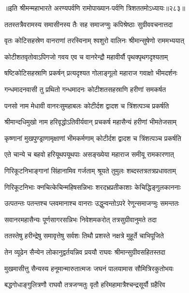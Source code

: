 ॥इति श्रीमन्महाभारते अरण्यपर्वणि रामोपाख्यान-पर्वणि त्रिशततमोऽध्यायः॥२८३॥

\storymeta

\resetShloka



\twolineshloka
{ततस्तत्रैवरामस्य समासीनस्य तैः सह}
{समाजग्मुः कपिश्रेष्ठाः सुग्रीववचनात्तदा}


\twolineshloka
{वृतः कोटिसहस्रेण वानराणां तरस्विनाम्}
{श्वशुरो वालिनः श्रीमान्सुषेणो राममभ्ययात्}


\twolineshloka
{कोटीशतवृतोवाऽपिगजो गवय एव च}
{वानरेन्द्रौ महावीर्यौ पृथक्पृथगदृश्यताम्}


\twolineshloka
{षष्टिकोटिसहस्राणि प्रकर्षन् प्रत्यदृश्यत}
{गोलाङ्गूलो महाराज गवाक्षो भीमदर्शनः}


\twolineshloka
{गन्धमादनवासी तु प्रथितो गन्धमादनः}
{कोटीशतसहस्राणि हरीणां समकर्षत}


\twolineshloka
{पनसो नाम मेधावी वानरःसुमहाबलः}
{कोटीर्दश द्वादश च त्रिंशत्पञ्च प्रकर्षति}


\twolineshloka
{श्रीमान्दधिमुखो नाम हरिवृद्धोऽतिवीर्यवान्}
{प्रचकर्ष महासैन्यं हरीणां भीमतेजसाम्}


\twolineshloka
{कृष्णानां मुखपुण्ड्राणामृक्षाणां भीमकर्मणाम्}
{कोटीर्दश द्वादश च त्रिंशत्पञ्च प्रकर्षति}


\twolineshloka
{एते चान्ये च बहवो हरियूथपयूथपाः}
{असङ्ख्येया महाराज समीयू रामकारणात्}


\twolineshloka
{गिरिकूटनिभाङ्गानां सिंहानामिव गर्जताम्}
{श्रूयते तुमुलः शब्दस्तत्रतत्रप्रधावताम्}


\twolineshloka
{गिरिकूटनिभाः क्नचित्केचिन्महिषसन्निभाः}
{शरदभ्रप्रतीकाशाः केचिद्धिङ्गुलकाननाः}


\twolineshloka
{उत्पतन्तः पतन्तश्च प्लवमानाश्च वानराः}
{उद्धुन्वन्तोऽपरे रेणून्समाजग्मुः समन्ततः}


\twolineshloka
{सवानरमहासैन्यः पूर्णसागरसन्निभः}
{निवेशमकरोत् तत्रसुग्रीवानुमते तदा}


\twolineshloka
{ततस्तेषु हरीन्द्रेषु समावृत्तेषु सर्वशः}
{तिथौ प्रशस्ते नक्षत्रे मुहूर्ते चाभिपूजिते}


\twolineshloka
{तेन व्यूढेन सैन्येन लोकानुद्वर्तयन्निव}
{प्रययौ राघवः श्रीमान्सुग्रीवसहितस्तदा}


\twolineshloka
{मुखमासीत्तु सैन्यस्य हनूमान्मारुतात्मजः}
{जघनं पालयामास सौमित्रिरकुतोभयः}


\twolineshloka
{बद्धगोधाङ्गुलित्रणौ राघवौ तत्रजग्मतुः}
{वृतौ हरिमहामात्रैश्चन्द्रसूर्यौ ग्रहैरिव}


